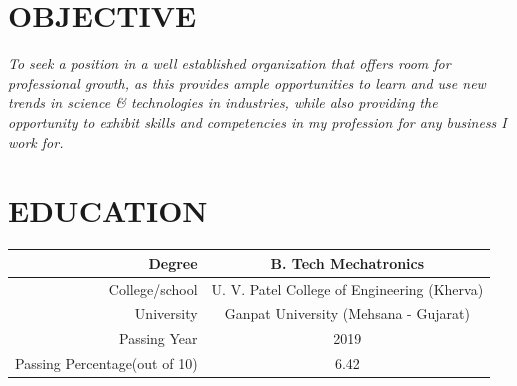 \documentclass[margin]{res}
\begin{document}
\begin{resume}

    \section{OBJECTIVE}
    {\sl To seek a position in a well established organization that offers room for professional growth, as this provides ample opportunities to learn and use new trends in science \& technologies in industries, while also providing the opportunity to exhibit skills and competencies in my profession for any business I work for.}
    
    \section{EDUCATION}
    \begin{tabular}{||r|c||}
        \hline
        Degree & B. Tech Mechatronics\\
        \hline
        College/school & U. V. Patel College of Engineering (Kherva)\\
        \hline
        University & Ganpat University (Mehsana - Gujarat)\\
        \hline
        Passing Year & 2019\\
        \hline
        Passing Percentage(out of 10) & 6.42 \\
        \hline
    \end{tabular}
    

\end{resume}
\end{document}
